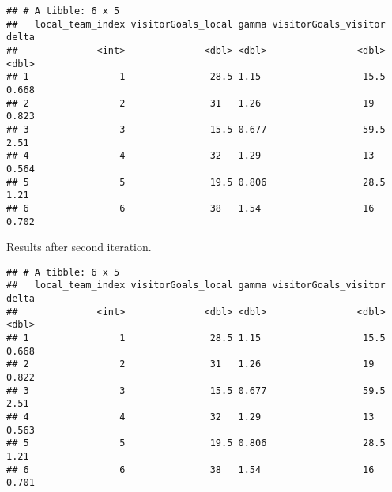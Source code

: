 \documentclass[
]{article}
\newenvironment{Shaded}{\begin{snugshade}}{\end{snugshade}}
\newcommand{\ControlFlowTok}[1]{\textcolor[rgb]{0.13,0.29,0.53}{\textbf{#1}}}
\newcommand{\DecValTok}[1]{\textcolor[rgb]{0.00,0.00,0.81}{#1}}
\newcommand{\FunctionTok}[1]{\textcolor[rgb]{0.00,0.00,0.00}{#1}}
\newcommand{\NormalTok}[1]{#1}
\newcommand{\OtherTok}[1]{\textcolor[rgb]{0.56,0.35,0.01}{#1}}
\newcommand{\SpecialCharTok}[1]{\textcolor[rgb]{0.00,0.00,0.00}{#1}}
\begin{document}
\begin{verbatim}
## # A tibble: 6 x 5
##   local_team_index visitorGoals_local gamma visitorGoals_visitor delta
##              <int>              <dbl> <dbl>                <dbl> <dbl>
## 1                1               28.5 1.15                  15.5 0.668
## 2                2               31   1.26                  19   0.823
## 3                3               15.5 0.677                 59.5 2.51 
## 4                4               32   1.29                  13   0.564
## 5                5               19.5 0.806                 28.5 1.21 
## 6                6               38   1.54                  16   0.702
\end{verbatim}

Results after second iteration.

\begin{Shaded}
\end{Shaded}

\begin{verbatim}
## # A tibble: 6 x 5
##   local_team_index visitorGoals_local gamma visitorGoals_visitor delta
##              <int>              <dbl> <dbl>                <dbl> <dbl>
## 1                1               28.5 1.15                  15.5 0.668
## 2                2               31   1.26                  19   0.822
## 3                3               15.5 0.677                 59.5 2.51 
## 4                4               32   1.29                  13   0.563
## 5                5               19.5 0.806                 28.5 1.21 
## 6                6               38   1.54                  16   0.701
\end{verbatim}
\end{document}
